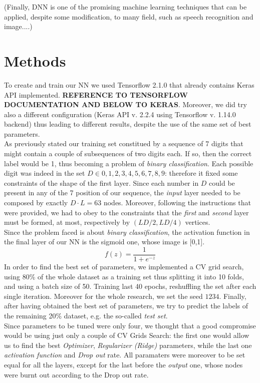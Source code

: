 \documentclass[prl,twocolumn]{revtex4-1}
\begin{document}
(Finally, DNN is one of the promising machine learning techniques that can be applied, despite some modification, to many field, such as speech recognition and image....)





\section{Methods}
To create and train our NN we used Tensorflow 2.1.0 that already contains Keras API implemented. \textbf{REFERENCE TO TENSORFLOW DOCUMENTATION AND BELOW TO KERAS}. Moreover, we did try also a different configuration (Keras API v. 2.2.4 using Tensorflow v. 1.14.0 backend) thus leading to different results, despite the use of the same set of best parameters.\\
As previously stated our training set constitued by a sequence of 7 digits that might contain a couple of subsequences of two digits each. If so, then the correct label would be 1, thus becoming a problem of \textit{binary classification}. Each possible digit was indeed in the set $D \in  {0,1,2,3,4,5,6,7,8,9}$: therefore it fixed some constraints of the shape of the first layer. Since each number in $D$ could be present in any of the 7 position of our sequence, the \textit{input} layer needed to be composed by exactly $D \cdot L=63$ nodes. Moreover, following the instructions that were provided, we had to obey to the constraints that the \textit{first} and \textit{second} layer must be formed, at most,  respectively by $(LD/2, LD/4)$ vertices.\\
Since the problem faced is about \textit{binary classification}, the activation function in the final layer of our NN is the sigmoid one,
whose image is [0,1].
\begin{equation}
f(z) = \frac{1}{1+e^{-z}}
\end{equation}
In order to find the best set of parameters, we implemented a CV grid search, using 80\% of the whole dataset as a training set thus splitting it into 10 folds, and using a batch size of 50. Training last 40 epochs, reshuffling the set after each single iteration. Moreover for the whole research, we set the seed $1234$. Finally, after having obtained the best set of parameters, we try to predict the labels of the remaining 20\% dataset, e.g. the so-called \textit{test set}.\\
Since parameters to be tuned were only four, we thought that a good compromise would be using just only a couple of CV Grids Search: the first one would allow us to find the best \textit{Optimizer}, \textit{Regularizer (Ridge)} parameters, while the last one \textit{activation function} and \textit{Drop out} rate. All paramaters were moreover to be set equal for all the layers, except for the last before the \textit{output} one, whose nodes were burnt out according to the Drop out rate.\\
\end{document}
